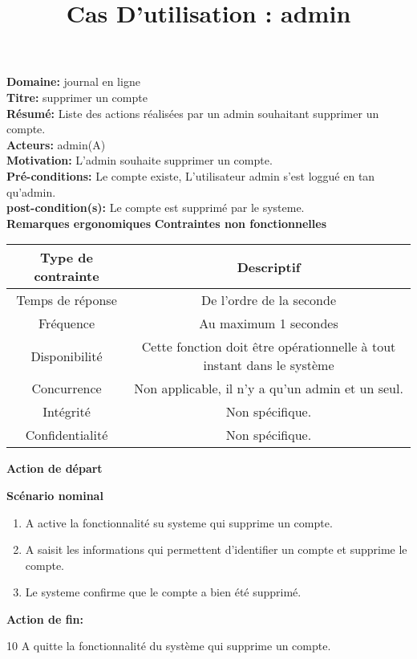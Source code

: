 \documentclass[a4paper,10pt]{article}
\title{Cas D'utilisation : admin}
\author{}
\begin{document}
\maketitle



\textbf{Domaine:} journal en ligne\\
\textbf{Titre:} supprimer un compte\\
\textbf{Résumé:} Liste des actions réalisées par un admin souhaitant supprimer un compte.\\
\textbf{Acteurs:} admin(A)\\
\textbf{Motivation:} L'admin souhaite supprimer un compte.\\
\textbf{Pré-conditions:} Le compte existe, L'utilisateur admin s'est loggué en tan qu'admin.\\
\textbf{post-condition(s):} Le compte est supprimé par le systeme.\\

\textbf{Remarques ergonomiques}
\textbf{Contraintes non fonctionnelles}
\begin{center}
  \begin{tabular}{|c|c|}
\hline
   \textbf{Type de contrainte}&\textbf{Descriptif}\\
\hline
Temps de réponse&De l'ordre de la seconde\\
\hline
Fréquence & Au maximum 1 secondes\\
\hline
Disponibilité & Cette fonction doit être opérationnelle à tout instant dans le système\\
\hline
Concurrence&Non applicable, il n'y a qu'un admin et un seul.\\
\hline
Intégrité&Non spécifique.\\
\hline
Confidentialité& Non spécifique.\\
\hline

  \end{tabular}
\end{center}

\textbf{Action de départ}

\textbf{Scénario nominal}
\begin{enumerate}
\item A active la fonctionnalité su systeme qui supprime un compte.
\item A saisit les informations qui permettent d'identifier un compte et supprime le compte.
\item Le systeme confirme que le compte a bien été supprimé.
\end{enumerate}

\textbf{Action de fin:}

10 A quitte la fonctionnalité du système qui supprime un compte.
\end{document}
